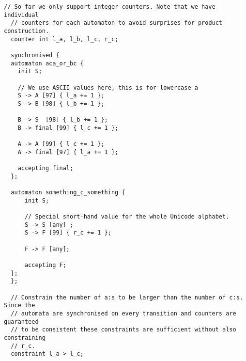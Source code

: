 \documentclass[acmsmall,review,anonymous,screen]{acmart}\settopmatter{printfolios=true,printccs=true,printacmref=true}
\theoremstyle{definition}
\begin{document}
\begin{lstlisting}[caption={An example input file for \Catra{} for the problem introduced in \cref{sec:motivation}, illustrating every major syntax element. From beginning to end: synchronised (product) automata using the keyword \texttt{synchronised} (automata A and B), labels (except those with ranges), register increments, and constraints on the final values of their counters.}, label=lst:input-example]
  // So far we only support integer counters. Note that we have individual
  // counters for each automaton to avoid surprises for product construction.
  counter int l_a, l_b, l_c, r_c;

  synchronised {
  automaton aca_or_bc {
    init S;
  
    // We use ASCII values here, this is for lowercase a
    S -> A [97] { l_a += 1 };
    S -> B [98] { l_b += 1 };
  
    B -> S  [98] { l_b += 1 };
    B -> final [99] { l_c += 1 };
  
    A -> A [99] { l_c += 1 };
    A -> final [97] { l_a += 1 };
  
    accepting final;
  };
  
  automaton something_c_something {
      init S;
  
      // Special short-hand value for the whole Unicode alphabet.
      S -> S [any] ;
      S -> F [99] { r_c += 1 };
  
      F -> F [any];
  
      accepting F;
  };
  };
  
  // Constrain the number of a:s to be larger than the number of c:s. Since the
  // automata are synchronised on every transition and counters are guaranteed
  // to be consistent these constraints are sufficient without also constraining
  // r_c.
  constraint l_a > l_c;
\end{lstlisting}

\end{document}
